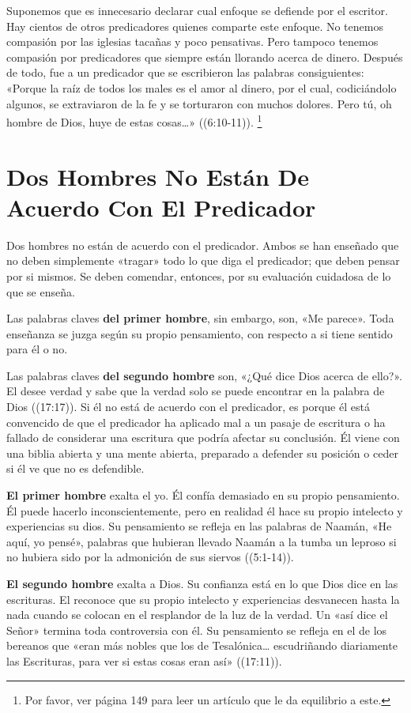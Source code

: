 \documentclass[12pt, twoside, openright]{book}
\begin{document}
Suponemos que es innecesario declarar cual enfoque se defiende por el escritor. Hay cientos de otros predicadores quienes comparte este enfoque. No tenemos compasión por las iglesias tacañas y poco pensativas. Pero tampoco tenemos compasión por predicadores que siempre están llorando acerca de dinero. Después de todo, fue a un predicador que se escribieron las palabras consiguientes: «Porque la raíz de todos los males es el amor al dinero, por el cual, codiciándolo algunos, se extraviaron de la fe y se torturaron con muchos dolores. Pero tú, oh hombre de Dios, huye de estas cosas\ldots» ((6:10-11)). \footnote{Por favor, ver página 149 para leer un artículo que le da equilibrio a este.} 

\section{Dos Hombres No Están De Acuerdo Con El Predicador}
Dos hombres no están de acuerdo con el predicador. Ambos se han enseñado que no deben simplemente «tragar» todo lo que diga el predicador; que deben pensar por si mismos. Se deben comendar, entonces, por su evaluación cuidadosa de lo que se enseña. 

Las palabras claves \textbf{del primer hombre}, sin embargo, son, «Me parece». Toda enseñanza se juzga según su propio pensamiento, con respecto a si tiene sentido para él o no. 

Las palabras claves \textbf{del segundo hombre} son, «¿Qué dice Dios acerca de ello?». El desee verdad y sabe que la verdad solo se puede encontrar en la palabra de Dios ((17:17)). Si él no está de acuerdo con el predicador, es porque él está convencido de que el predicador ha aplicado mal a un pasaje de escritura o ha fallado de considerar una escritura que podría afectar su conclusión. Él viene con una biblia abierta y una mente abierta, preparado a defender su posición o ceder si él ve que no es defendible. 

\textbf{El primer hombre} exalta el yo. Él confía demasiado en su propio pensamiento. Él puede hacerlo inconscientemente, pero en realidad él hace su propio intelecto y experiencias su dios. Su pensamiento se refleja en las palabras de Naamán, «He aquí, yo pensé», palabras que hubieran llevado Naamán a la tumba un leproso si no hubiera sido por la admonición de sus siervos ((5:1-14)). 

\textbf{El segundo hombre} exalta a Dios. Su confianza está en lo que Dios dice en las escrituras. El reconoce que su propio intelecto y experiencias desvanecen hasta la nada cuando se colocan en el resplandor de la luz de la verdad. Un «así dice el Señor» termina toda controversia con él. Su pensamiento se refleja en el de los bereanos que «eran más nobles que los de Tesalónica… escudriñando diariamente las Escrituras, para ver si estas cosas eran así» ((17:11)). 
\end{document}
